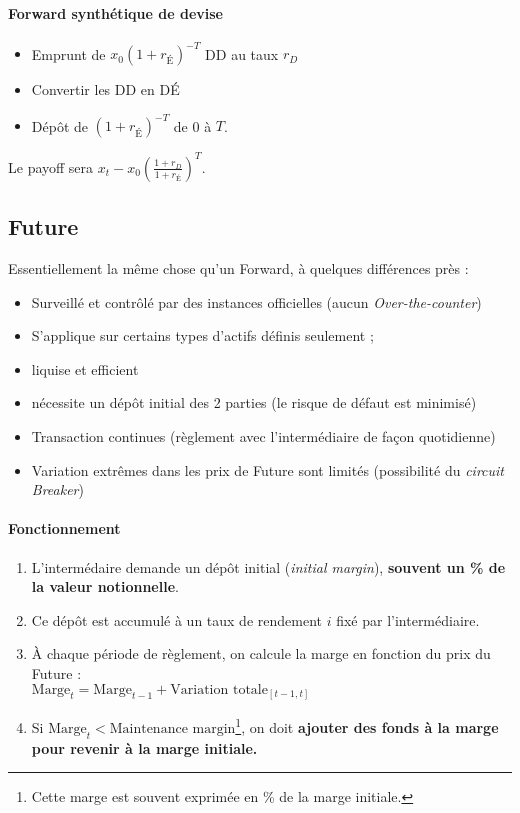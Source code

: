 \documentclass[10pt, french]{article}
\begin{document}
\begin{multicols*}{2}
\paragraph{Forward synthétique de devise}
\begin{itemize}
\item Emprunt de $x_0(1+r_{É})^{-T}$ DD au taux $r_D$
\item Convertir les DD en DÉ
\item Dépôt de $(1+r_{É})^{-T}$ de 0 à $T$.
\end{itemize}
Le payoff sera $x_t - x_0 \left(  \frac{1+r_D}{1+r_{É}}   \right)^{T}$.


\subsection*{Future}
Essentiellement la même chose qu'un Forward, à quelques différences près : 
\begin{itemize}
\item Surveillé et contrôlé par des instances officielles (aucun \textit{Over-the-counter})
\item S'applique sur certains types d'actifs définis seulement ;
\item liquise et efficient
\item nécessite un dépôt initial des 2 parties (le risque de défaut est minimisé)
\item Transaction continues (règlement avec l'intermédiaire de façon quotidienne)
\item Variation extrêmes dans les prix de Future sont limités (possibilité du \textit{circuit Breaker})
\end{itemize}

\paragraph{Fonctionnement}
\begin{enumerate}
\item L'intermédaire demande un dépôt initial (\textit{initial margin}), \textbf{souvent un \% de la valeur notionnelle}.
\item Ce dépôt est accumulé à un taux de rendement $i$ fixé par l'intermédiaire.
\item À chaque période de règlement, on calcule la marge en fonction du prix du Future : \\
$\text{Marge}_t = \text{Marge}_{t-1} + \text{Variation totale}_{[t-1, t]}$
\item Si $\text{Marge}_t  < \text{Maintenance margin}$\footnote{Cette marge est souvent exprimée en \% de la marge initiale.}, on doit \textbf{ajouter des fonds à la marge pour revenir à la marge initiale.}
\end{enumerate}




\end{multicols*}
\end{document}
